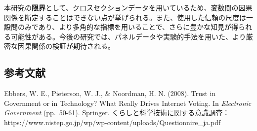 \documentclass[
  xelatex]{bxjsarticle}
\begin{document}
本研究の\textbf{限界}として、クロスセクションデータを用いているため、変数間の因果関係を断定することはできない点が挙げられる。また、使用した信頼の尺度は一設問のみであり、より多角的な指標を用いることで、さらに豊かな知見が得られる可能性がある。今後の研究では、パネルデータや実験的手法を用いた、より厳密な因果関係の検証が期待される。

\subsection{参考文献}\label{ux53c2ux8003ux6587ux732e}

Ebbers, W. E., Pieterson, W. J., \& Noordman, H. N. (2008). Trust in
Government or in Technology? What Really Drives Internet Voting. In
\emph{Electronic Government} (pp.~50-61). Springer.
くらしと科学技術に関する意識調査：https://www.nistep.go.jp/wp/wp-content/uploads/Questionnire\_ja.pdf
\end{document}
